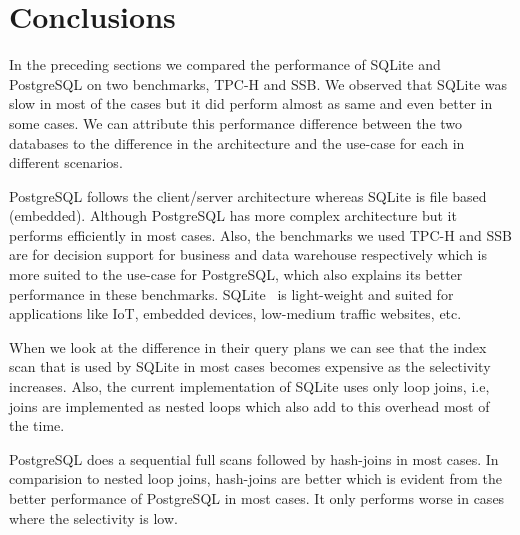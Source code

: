 \section{Conclusions}
\label{sec:conclusion}
In the preceding sections we compared the performance of SQLite and PostgreSQL on two benchmarks, TPC-H and SSB. We observed that SQLite was slow in most of the cases but it did perform almost as same and even better in some cases. We can attribute this performance difference between the two databases to the difference in the architecture and the use-case for each in different scenarios.

PostgreSQL follows the client/server architecture whereas SQLite is file based (embedded). Although PostgreSQL has more complex architecture but it performs efficiently in most cases. Also, the benchmarks we used TPC-H and SSB are for decision support for business and data warehouse respectively which is more suited to the use-case for PostgreSQL, which also explains its better performance in these benchmarks. SQLite~\cite{ref:compare} is light-weight and suited for applications like IoT, embedded devices, low-medium traffic websites, etc. 

When we look at the difference in their query plans we can see that the index scan that is used by SQLite in most cases becomes expensive as the selectivity increases. Also, the current implementation of SQLite uses only loop joins, i.e, joins are implemented as nested loops which also add to this overhead most of the time.

PostgreSQL does a sequential full scans followed by hash-joins in most cases. In comparision to nested loop joins, hash-joins are better which is evident from the better performance of PostgreSQL in most cases. It only performs worse in cases where the selectivity is low.
 
